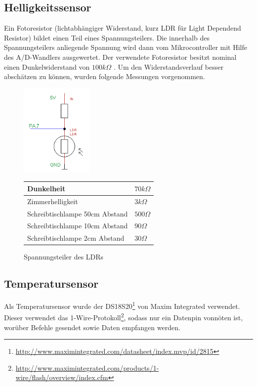 \subsection{Helligkeitssensor}
Ein Fotoresistor (lichtabhängiger Widerstand, kurz LDR für Light Dependend Resistor) bildet einen Teil eines Spannungsteilers. Die innerhalb des Spannungsteilers anliegende Spannung wird dann vom Mikrocontroller mit Hilfe des A/D-Wandlers ausgewertet.
Der verwendete Fotoresistor besitzt nominal einen Dunkelwiderstand von $100 k\Omega$ .
Um den Widerstandsverlauf besser abschätzen zu können, wurden folgende Messungen vorgenommen.
\begin{figure}[h]
  \begin{center}
  \begin{minipage}[b]{0.3\textwidth}
        \includegraphics[height=4.5cm]{skizzen/helligkeitssensor_schmatic.png}
        \caption{Spannungsteiler des LDRs}
  \end{minipage}
  \hspace{0.07\textwidth} 
  \begin{minipage}[b]{0.6\textwidth}
    \begin{tabular}[h]{||l | l||}
	  \hline \hline
	  Dunkelheit& $70 k\Omega$ \\ \hline
	  Zimmerhelligkeit & $3 k\Omega$ \\ \hline
	  Schreibtischlampe 50cm Abstand& $500 \Omega$ \\ \hline
	  Schreibtischlampe 10cm Abstand& $90 \Omega$ \\ \hline
	  Schreibtischlampe 2cm Abstand& $30 \Omega$  \\
	  \hline\hline
    \end{tabular} 
    \label{Modellversuch} 
  \end{minipage}
  \end{center}
\end{figure}
%
\subsection{Temperatursensor}
Als Temperatursensor wurde der DS18S20\footnote{\url{http://www.maximintegrated.com/datasheet/index.mvp/id/2815}} von Maxim Integrated verwendet. Dieser verwendet das 1-Wire\textsuperscript{\textregistered}-Protokoll\footnote{\url{http://www.maximintegrated.com/products/1-wire/flash/overview/index.cfm}}, sodass nur ein Datenpin vonnöten ist, worüber Befehle gesendet sowie Daten empfangen werden.

